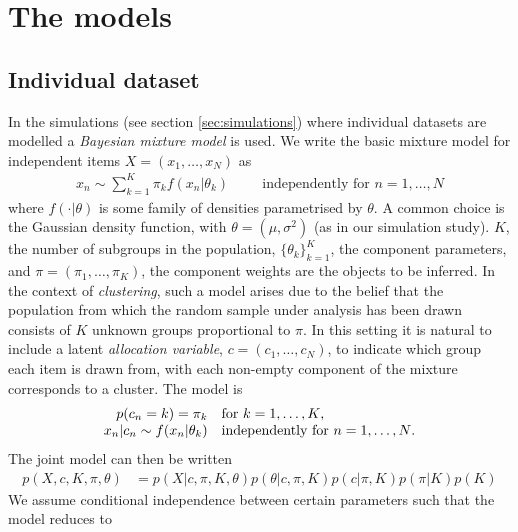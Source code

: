 \documentclass[]{article}
\begin{document}
\section{The models} \label{sec:models}

\subsection{Individual dataset}
In the simulations (see section \ref{sec:simulations}) where individual datasets are modelled a \emph{Bayesian mixture model} is used. We write the basic mixture model for independent items $X=(x_1, \ldots, x_N)$ as 
\begin{align}
	x_n \sim \sum_{k=1}^K\pi_k f(x_n | \theta_k) \hspace{1cm} \textrm{independently for $n = 1,\ldots,N$}
\end{align}
where $f(\cdot| \theta)$ is some family of densities parametrised by $\theta$. A common choice is the Gaussian density function, with $\theta=(\mu, \sigma^2)$ (as in our simulation study). $K$, the number of subgroups in the population, $\{\theta_k\}_{k=1}^K$, the component parameters, and $\pi=(\pi_1, \ldots, \pi_K)$, the component weights are the objects to be inferred. In the context of \emph{clustering}, such a model arises due to the belief that the population from which the random sample under analysis has been drawn consists of $K$ unknown groups proportional to $\pi$. In this setting it is natural to include a latent \emph{allocation variable}, $c=(c_1, \ldots, c_N)$, to indicate which group each item is drawn from, with each non-empty component of the mixture corresponds to a cluster. The model is
\begin{equation}
	\label{eqn:mixModel}
	\begin{array}{r@{}l l}
		p(c_n = k) = \pi_k&  &\textrm{for $k = 1,\ldots,K$,} \\
		x_n | c_n \sim f(x_n | \theta_k)& &\textrm{independently for $n = 1,\ldots,N$.} 
	\end{array}
\end{equation}
The joint model can then be written
\begin{align}
	p(X, c, K, \pi, \theta) &= p(X | c, \pi, K, \theta) p(\theta | c, \pi, K) p(c | \pi, K) p(\pi | K) p(K) \nonumber
\end{align}
We assume conditional independence between certain parameters such that the model reduces to
\end{document}

